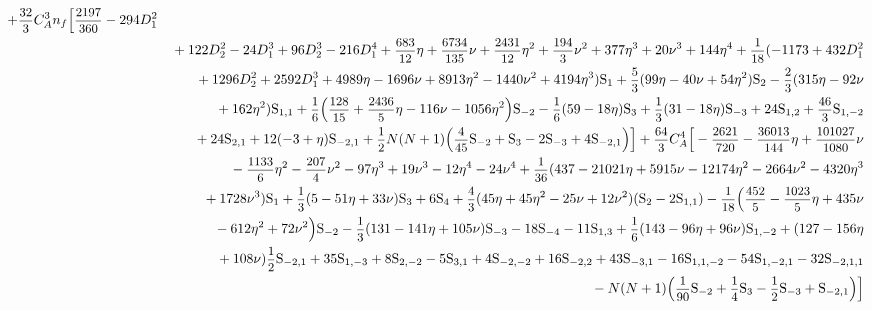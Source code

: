 \documentclass[
 twocolumn,
 superscriptaddress,
 preprintnumbers,
 nofootinbib,
 amsmath,amssymb,
 aps,
 prl
 ]{revtex4-2}
\newcommand\HS{\mathrm{S}}
\def\D#1{D_#1}
\def\frct#1#2{\mbox{\small{$\displaystyle\frac{#1}{#2}$}}}
\begin{document}
\begin{widetext}
\begin{eqnarray}
+\frct{32}{3}\*C_A^3\*n_f\*\Big[
\frct{2197}{360}
-294\*\D1^2
\nonumber\\
&&{}
+122\*\D2^2
-24\*\D1^3
+96\*\D2^3
-216\*\D1^4
+\frct{683}{12}\*\eta
+\frct{6734}{135}\*\nu
+\frct{2431}{12}\*\eta^2
+\frct{194}{3}\*\nu^2
+377\*\eta^3
+20\*\nu^3
+144\*\eta^4
+\frct{1}{18}\*(
-1173
+432\*\D1^2
\nonumber\\
&&{}
+1296\*\D2^2
+2592\*\D1^3
+4989\*\eta
-1696\*\nu
+8913\*\eta^2
-1440\*\nu^2
+4194\*\eta^3
)\*\HS_{1}
+\frct{5}{3}\*(99\*\eta
-40\*\nu
+54\*\eta^2
)\*\HS_{2}
-\frct{2}{3}\*(
315\*\eta
-92\*\nu
\nonumber\\
&&{}
+162\*\eta^2
)\*\HS_{1,1}
+\frct{1}{6}\*\Big(
\frct{128}{15}
+\frct{2436}{5}\*\eta
-116\*\nu
-1056\*\eta^2
\Big)\*\HS_{-2}
-\frct{1}{6}\*(
59
-18\*\eta)\*\HS_{3}
+\frct{1}{3}\*(31
-18\*\eta)\*\HS_{-3}
+24\*\HS_{1,2}
+\frct{46}{3}\*\HS_{1,-2}
\nonumber\\
&&{}
+24\*\HS_{2,1}
+12\*(
-3
+\eta)\*\HS_{-2,1}
+\frct{1}{2}\*N\*(N+1)\*\Big(
\frct{4}{45}\*\HS_{-2}
+\HS_{3}
-2\*\HS_{-3}
+4\*\HS_{-2,1}\Big)\Big]

+\frct{64}{3}\*C_A^4\*\Big[
-\frct{2621}{720}
-\frct{36013}{144}\*\eta
+\frct{101027}{1080}\*\nu
\nonumber\\
&&{}
-\frct{1133}{6}\*\eta^2
-\frct{207}{4}\*\nu^2
-97\*\eta^3
+19\*\nu^3
-12\*\eta^4
-24\*\nu^4
+\frct{1}{36}\*(437
-21021\*\eta
+5915\*\nu
-12174\*\eta^2
-2664\*\nu^2
-4320\*\eta^3
\nonumber\\
&&{}
+1728\*\nu^3)\*\HS_{1}
+\frct{1}{3}\*(5
-51\*\eta
+33\*\nu)\*\HS_{3}
+6\*\HS_{4}
+\frct{4}{3}\*(45\*\eta
+45\*\eta^2
-25\*\nu
+12\*\nu^2)\*(\HS_{2}-2\*\HS_{1,1})
-\frct{1}{18}\*\Big(
\frct{452}{5}
-\frct{1023}{5}\*\eta
+435\*\nu
\nonumber\\
&&{}
-612\*\eta^2
+72\*\nu^2
\Big)\*\HS_{-2}
-\frct{1}{3}\*(
131
-141\*\eta
+105\*\nu)\*\HS_{-3}
-18\*\HS_{-4}
-11\*\HS_{1,3}
+\frct{1}{6}\*(143
-96\*\eta
+96\*\nu)\*\HS_{1,-2}
+(127
-156\*\eta
\nonumber\\
&&{}
+108\*\nu)\*\frct{1}{2}\*\HS_{-2,1}
+35\*\HS_{1,-3}
+8\*\HS_{2,-2}
-5\*\HS_{3,1}
+4\*\HS_{-2,-2}
+16\*\HS_{-2,2}
+43\*\HS_{-3,1}
-16\*\HS_{1,1,-2}
-54\*\HS_{1,-2,1}
-32\*\HS_{-2,1,1}
\nonumber\\
&&{}
-N\*(N+1)\*\Big(
\frct{1}{90}\*\HS_{-2}
+\frct{1}{4}\*\HS_{3}
-\frct{1}{2}\*\HS_{-3}
+\HS_{-2,1}
\Big)
\Big]


\end{eqnarray}
\end{widetext}
\end{document}
